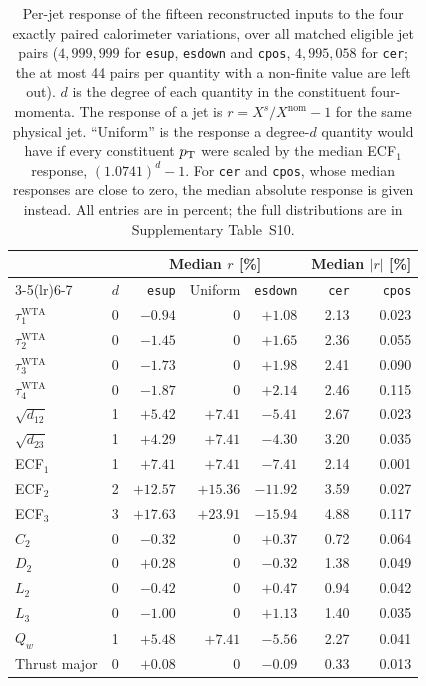 \begin{table}[tbp]
\centering\footnotesize
\setlength{\tabcolsep}{2.6pt}
\caption{Per-jet response of the fifteen reconstructed inputs to the four exactly paired calorimeter variations, over all matched eligible jet pairs ($4{,}999{,}999$ for \texttt{esup}, \texttt{esdown} and \texttt{cpos}, $4{,}995{,}058$ for \texttt{cer}; the at most 44 pairs per quantity with a non-finite value are left out). $d$ is the degree of each quantity in the constituent four-momenta. The response of a jet is $r = X^{s}/X^{\mathrm{nom}}-1$ for the same physical jet. ``Uniform'' is the response a degree-$d$ quantity would have if every constituent $p_{\mathrm{T}}$ were scaled by the median ECF$_1$ response, $(1.0741)^{d}-1$. For \texttt{cer} and \texttt{cpos}, whose median responses are close to zero, the median absolute response is given instead. All entries are in percent; the full distributions are in Supplementary Table~S10.}
\label{tab:feature-response}
\begin{tabular}{lcrrrrr}
\toprule
 & & \multicolumn{3}{c}{Median $r$ [\%]} & \multicolumn{2}{c}{Median $|r|$ [\%]} \\
\cmidrule(lr){3-5}\cmidrule(lr){6-7}
 & $d$ & \texttt{esup} & Uniform & \texttt{esdown} & \texttt{cer} & \texttt{cpos} \\
\midrule
$\tau_1^{\mathrm{WTA}}$ & 0 & $-0.94$ & $0$ & $+1.08$ & 2.13 & 0.023 \\
$\tau_2^{\mathrm{WTA}}$ & 0 & $-1.45$ & $0$ & $+1.65$ & 2.36 & 0.055 \\
$\tau_3^{\mathrm{WTA}}$ & 0 & $-1.73$ & $0$ & $+1.98$ & 2.41 & 0.090 \\
$\tau_4^{\mathrm{WTA}}$ & 0 & $-1.87$ & $0$ & $+2.14$ & 2.46 & 0.115 \\
$\sqrt{d_{12}}$ & 1 & $+5.42$ & $+7.41$ & $-5.41$ & 2.67 & 0.023 \\
$\sqrt{d_{23}}$ & 1 & $+4.29$ & $+7.41$ & $-4.30$ & 3.20 & 0.035 \\
ECF$_1$ & 1 & $+7.41$ & $+7.41$ & $-7.41$ & 2.14 & 0.001 \\
ECF$_2$ & 2 & $+12.57$ & $+15.36$ & $-11.92$ & 3.59 & 0.027 \\
ECF$_3$ & 3 & $+17.63$ & $+23.91$ & $-15.94$ & 4.88 & 0.117 \\
$C_2$ & 0 & $-0.32$ & $0$ & $+0.37$ & 0.72 & 0.064 \\
$D_2$ & 0 & $+0.28$ & $0$ & $-0.32$ & 1.38 & 0.049 \\
$L_2$ & 0 & $-0.42$ & $0$ & $+0.47$ & 0.94 & 0.042 \\
$L_3$ & 0 & $-1.00$ & $0$ & $+1.13$ & 1.40 & 0.035 \\
$Q_w$ & 1 & $+5.48$ & $+7.41$ & $-5.56$ & 2.27 & 0.041 \\
Thrust major & 0 & $+0.08$ & $0$ & $-0.09$ & 0.33 & 0.013 \\
\bottomrule
\end{tabular}
\end{table}
